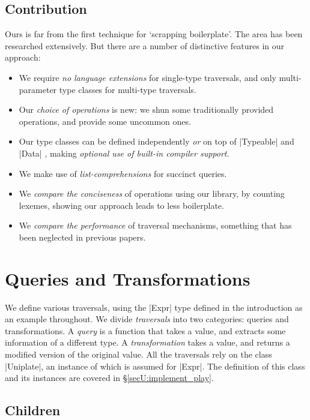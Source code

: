 \subsection{Contribution}

Ours is far from the first technique for `scrapping boilerplate'. The area has been researched extensively. But there are a number of distinctive features in our approach:

\begin{itemize}
\item We require \textit{no language extensions} for single-type traversals, and only multi-parameter type classes \citep{jones:mptc} for multi-type traversals.
\item Our \textit{choice of operations} is new: we shun some traditionally provided operations, and provide some uncommon ones.
\item Our type classes can be defined independently \textit{or} on top of |Typeable| and |Data| \citep{lammel:syb}, making \textit{optional use of built-in compiler support}.
\item We make use of \textit{list-comprehensions} \citep{wadler:list_comprehensions} for succinct queries.
\item We \textit{compare the conciseness} of operations using our library, by counting lexemes, showing our approach leads to less boilerplate.
\item We \textit{compare the performance} of traversal mechanisms, something that has been neglected in previous papers.
\end{itemize}

\section{Queries and Transformations}
\label{secU:use_play}

We define various traversals, using the |Expr| type defined in the introduction as an example throughout. We divide \textit{traversals} into two categories: queries and transformations. A \textit{query} is a function that takes a value, and extracts some information of a different type. A \textit{transformation} takes a value, and returns a modified version of the original value. All the traversals rely on the class |Uniplate|, an instance of which is assumed for |Expr|. The definition of this class and its instances are covered in \S\ref{secU:implement_play}.

\subsection{Children}

